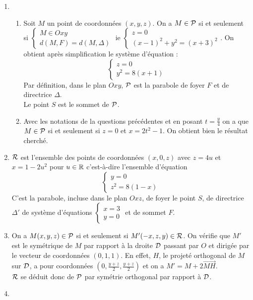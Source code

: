 
\begin{enumerate}
\item 
\begin{enumerate}
\item Soit $M$ un point de coordonnées $(x,y,z)$. On a $M\in\cal P$ si et seulement si $\left\{\begin{array}{l}
M\in Oxy\\
d(M,F)=d(M,\Delta)
\end{array}\right.$ ie
$\left\{\begin{array}{l}
z=0\\
(x-1)^2+y^2=(x+3)^2
\end{array}\right.$.
 On obtient après simplification le système d'équation : $$\left\{\begin{array}{l}
z=0\\
y^2=8(x+1)
\end{array}\right.$$
Par définition, dans le plan $Oxy$, $\cal P$ est la parabole  de foyer $F$ et de directrice $\Delta$.\\ 
Le point $S$ est le sommet de $\cal P$.
\item Avec les notations de la questions précédentes et en posant $t=\frac y4$ on a que $M\in\cal P$ si et seulement si $z=0$ et $x=2t^2-1$. On obtient bien le résultat cherché.
\end{enumerate}
\item $\cal R$ est l'ensemble des points de coordonnées $(x,0,z)$ avec $z=4u$ et $x=1-2u^2$ pour $u\in\mathbb{R}$ c'est-à-dire l'ensemble d'équation  
$$\left\{\begin{array}{l}
y=0\\
z^2=8(1-x)
\end{array}\right.$$
C'est la parabole, incluse dans le plan $Oxz$, de foyer le point $S$, de directrice $\Delta'$ de système d'équations $\left\{\begin{array}{l}
x=3\\
y=0
\end{array}\right.$ et de sommet $F$.
\item On a $M(x,y,z)\in\cal P$ si et seulement si $M'(-x,z,y)\in\cal R$. On vérifie que $M'$ est le symétrique de $M$  par rapport à la droite $\cal D$ passant par $O$ et dirigée par le vecteur de coordonnées $(0,1,1)$. En effet, $H$, le projeté orthogonal de $M$ sur $\cal D$, a pour coordonnées $(0, \frac{y+z}2,\frac{y+z}2)$ et on a $M'=M+2\overrightarrow{MH}$.\\
$\cal R$ se déduit donc de $\cal P$ par symétrie orthogonal par rapport à $\cal D$. 
\item \begin{enumerate}

\end{enumerate}
\end{enumerate}
